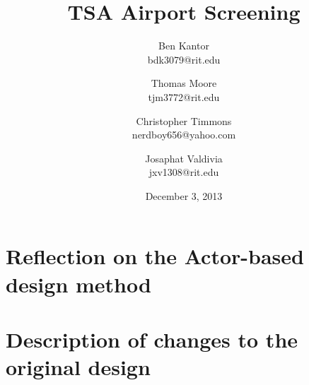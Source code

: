 \documentclass[12pt,letterpaper]{scrartcl}
\title{TSA Airport Screening}
\author{
    Ben Kantor \\
    bdk3079@rit.edu
    \and
    Thomas Moore \\
    tjm3772@rit.edu
    \and
    Christopher Timmons \\
    nerdboy656@yahoo.com
    \and
    Josaphat Valdivia \\
    jxv1308@rit.edu
}
\date{December 3, 2013}
\begin{document}
\maketitle %

\section{Reflection on the Actor-based design method}
\lipsum[1] %
\lipsum[2]

\section{Description of changes to the original design}
\lipsum[3]
\lipsum[4]
\lipsum[5]
\end{document}
